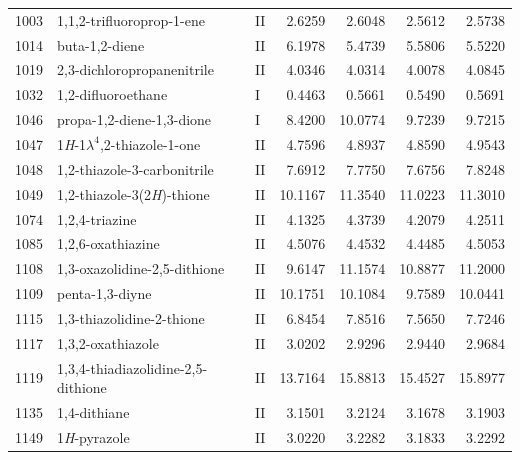 \begin{longtable}{rlld{2.5}d{2.5}d{2.5}d{2.5}}
    1003 & 1,1,2-trifluoroprop-1-ene                              & II & 2.6259  & 2.6048  & 2.5612  & 2.5738  \\
    1014 & buta-1,2-diene                                         & II & 6.1978  & 5.4739  & 5.5806  & 5.5220  \\
    1019 & 2,3-dichloropropanenitrile                             & II & 4.0346  & 4.0314  & 4.0078  & 4.0845  \\
    1032 & 1,2-difluoroethane                                     & I  & 0.4463  & 0.5661  & 0.5490  & 0.5691  \\
    1046 & propa-1,2-diene-1,3-dione                              & I  & 8.4200  & 10.0774 & 9.7239  & 9.7215  \\
    1047 & 1\textit{H}-1$\lambda^4$,2-thiazole-1-one              & II & 4.7596  & 4.8937  & 4.8590  & 4.9543  \\
    1048 & 1,2-thiazole-3-carbonitrile                            & II & 7.6912  & 7.7750  & 7.6756  & 7.8248  \\
    1049 & 1,2-thiazole-3(2\textit{H})-thione                     & II & 10.1167 & 11.3540 & 11.0223 & 11.3010 \\
    1074 & 1,2,4-triazine                                         & II & 4.1325  & 4.3739  & 4.2079  & 4.2511  \\
    1085 & 1,2,6-oxathiazine                                      & II & 4.5076  & 4.4532  & 4.4485  & 4.5053  \\
    1108 & 1,3-oxazolidine-2,5-dithione                           & II & 9.6147  & 11.1574 & 10.8877 & 11.2000 \\
    1109 & penta-1,3-diyne                                        & II & 10.1751 & 10.1084 & 9.7589  & 10.0441 \\
    1115 & 1,3-thiazolidine-2-thione                              & II & 6.8454  & 7.8516  & 7.5650  & 7.7246  \\
    1117 & 1,3,2-oxathiazole                                      & II & 3.0202  & 2.9296  & 2.9440  & 2.9684  \\
    1119 & 1,3,4-thiadiazolidine-2,5-dithione                     & II & 13.7164 & 15.8813 & 15.4527 & 15.8977 \\
    1135 & 1,4-dithiane                                           & II & 3.1501  & 3.2124  & 3.1678  & 3.1903  \\
    1149 & 1\textit{H}-pyrazole                                   & II & 3.0220  & 3.2282  & 3.1833  & 3.2292  \\

\end{longtable}

